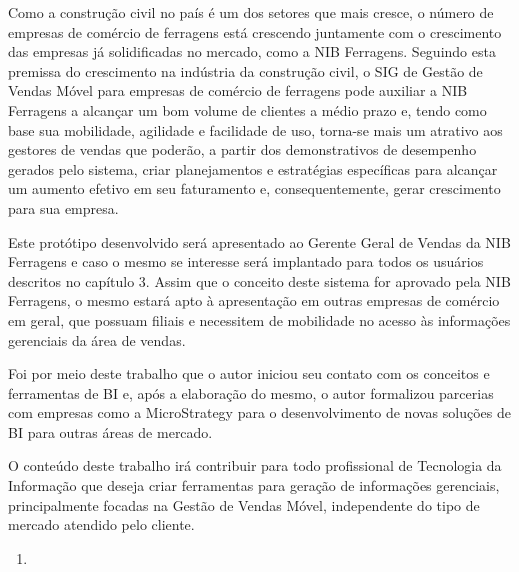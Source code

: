 \documentclass[a4paper]{article}
\newcounter{saveenum}
\newcommand\liststyleWWviiiNumi{%
\renewcommand\theenumi{\arabic{enumi}}
\renewcommand\theenumii{\arabic{enumi}.\arabic{enumii}}
\renewcommand\theenumiii{\arabic{enumi}.\arabic{enumii}.\arabic{enumiii}}
\renewcommand\theenumiv{\arabic{enumi}.\arabic{enumii}.\arabic{enumiii}.\arabic{enumiv}}
\renewcommand\labelenumi{\theenumi}
\renewcommand\labelenumii{\theenumii}
\renewcommand\labelenumiii{\theenumiii}
\renewcommand\labelenumiv{\theenumiv.}
}
\begin{document}
{
\textsf{Como a constru\c{c}\~ao civil no pa\'is \'e um dos setores que mais cresce, o n\'umero de empresas de com\'ercio
de ferragens est\'a crescendo juntamente com o crescimento das empresas j\'a solidificadas no mercado, como a NIB
Ferragens. Seguindo esta premissa do crescimento na ind\'ustria da constru\c{c}\~ao civil, o SIG de Gest\~ao de Vendas
M\'ovel para empresas de com\'ercio de ferragens pode auxiliar a NIB Ferragens a alcan\c{c}ar um bom volume de clientes
a m\'edio prazo e, tendo como base sua mobilidade, agilidade e facilidade de uso, torna-se mais um atrativo aos
gestores de vendas que poder\~ao, a partir dos demonstrativos de desempenho gerados pelo sistema, criar planejamentos e
estrat\'egias espec\'ificas para alcan\c{c}ar um aumento efetivo em seu faturamento e, consequentemente, gerar
crescimento para sua empresa.}}

{\sffamily
Este prot\'otipo desenvolvido ser\'a apresentado ao Gerente Geral de Vendas da NIB Ferragens e caso o mesmo se interesse
ser\'a implantado para todos os usu\'arios descritos no cap\'itulo 3. Assim que o conceito deste sistema for aprovado
pela NIB Ferragens, o mesmo estar\'a apto \`a apresenta\c{c}\~ao em outras empresas de com\'ercio em geral, que possuam
filiais e necessitem de mobilidade no acesso \`as informa\c{c}\~oes gerenciais da \'area de vendas.}

{
\textsf{Foi por meio deste trabalho que o autor iniciou seu contato com os conceitos e ferramentas de BI e, ap\'os a
elabora\c{c}\~ao do mesmo, o autor formalizou parcerias com empresas como a MicroStrategy para o desenvolvimento de
novas solu\c{c}\~oes de BI para outras \'areas de mercado.}}

{\sffamily
O conte\'udo deste trabalho ir\'a contribuir para todo profissional de Tecnologia da Informa\c{c}\~ao que deseja criar
ferramentas para gera\c{c}\~ao de informa\c{c}\~oes gerenciais, principalmente focadas na Gest\~ao de Vendas M\'ovel,
independente do tipo de mercado atendido pelo cliente.}


\bigskip

\liststyleWWviiiNumi
\setcounter{saveenum}{\value{enumi}}
\begin{enumerate}
\setcounter{enumi}{\value{saveenum}}
\item {}
\end{enumerate}
\end{document}

